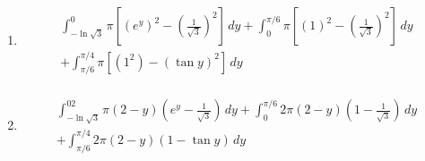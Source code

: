 \documentclass[a4paper, 12pt]{article}
\begin{document}
\begin{enumerate}[leftmargin=*,label=\textbf{\arabic*.}]
\begin{enumerate}[leftmargin=*,label=\textbf{\alph*.}]
Calculate the first integral in \eqref{eq:21_22_fall_final_1} by integration by parts.
\[\left.\begin{array}{c}
u=\arctan x\implies du=\dfrac1{x^2+1}\,dx\\[1em]
dv=dx\implies v=x
\end{array}\right\}\rightarrow \int u\,dv=uv-\int v\,du\]
\begin{align*}\int_{1/\sqrt3}^1\arctan x\,dx&=x\arctan x\bigg|_{1/\sqrt3}^1-\int_{1/\sqrt3}^1\frac{x}{x^2+1}\,dx\\[1em]&=\left(x\arctan x-\frac12\ln\left|x^2+1\right|\right)\Bigg|_{1/\sqrt3}^1\\[1em]&=\left(\frac\pi4-\frac{\ln 2}2\right)-\left(\frac{\pi\sqrt3}{18}-\frac12\ln\left(\frac43\right)\right)=\frac{\pi\left(9-2\sqrt3\right)}{36}+\frac12\ln\frac23\end{align*}

Calculate the second integral in\eqref{eq:21_22_fall_final_1} by integration by parts.
\[\left.\begin{array}{c}
u=\ln x\implies du=\dfrac1x\,dx\\[1em]
dv=dx\implies v=x
\end{array}\right\}\rightarrow \int u\,dv=uv-\int v\,du\]
\begin{align*}\int_{1/\sqrt3}^1\ln x\,dx&=x\ln x\bigg|_{1/\sqrt3}^1-\int_{1/\sqrt3}^1\,dx=\left(x\ln x-x\right)\Bigg|_{1/\sqrt3}^1\\[1em]&=\left(0-1\right)-\left(-\frac{\ln\sqrt3}{\sqrt3}-\frac1{\sqrt3}\right)=\frac{\sqrt3\ln\sqrt3+\sqrt3-3}3\end{align*}

The result is then
\[\boxed{A=\frac{\pi\left(9-2\sqrt3\right)}{36}+\frac12\cdot\ln\frac23-\frac{\sqrt3\ln\sqrt3+\sqrt3-3}3}\]

\item\leavevmode
\vspace{-2em}
\begin{align*}\boxed{\begin{array}{l}\displaystyle\int_{-\ln\sqrt3}^0\pi\left[\left( e^y\right)^2-\left(\frac1{\sqrt3}\right)^2\right]\,dy+\int_0^{\pi/6}\pi\left[(1)^2-\left(\frac1{\sqrt3}\right)^2\right]\,dy\\[1em]\displaystyle+\int_{\pi/6}^{\pi/4}\pi\left[(1^2)-\left(\tan y\right)^2\right]\,dy\end{array}}\end{align*}

\item\leavevmode
\vspace{-2em}
\begin{align*}\boxed{\begin{array}{l}\displaystyle\int_{-\ln\sqrt3}^02\pi\left(2-y\right)\left( e^y-\frac1{\sqrt3}\right)\,dy+\int_0^{\pi/6}2\pi\left(2-y\right)\left(1-\frac1{\sqrt3}\right)\,dy\\[1em]\displaystyle+\int_{\pi/6}^{\pi/4}2\pi\left(2-y\right)\left(1-\tan y\right)\,dy\end{array}}\end{align*}
\end{enumerate}


\end{enumerate}
\end{document}
